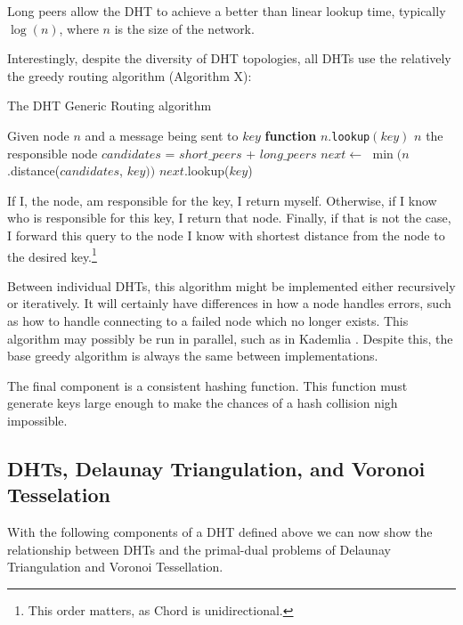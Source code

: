 \documentclass[11pt,conference]{IEEEtran}
\begin{document}
Long peers allow the DHT to achieve a better than linear lookup time, typically $ \log(n) $, where $n$ is the size of the network. 

Interestingly, despite the diversity of DHT topologies, all DHTs use the relatively the greedy routing algorithm (Algorithm X):

\begin{algorithm}
	\caption{The DHT Generic Routing algorithm}
	\label{alg:routing}
	\begin{algorithmic}[1]
		\STATE Given node $n$ and a message being sent to $key$
		\STATE \textbf{function} $n.$\texttt{lookup}$(key)$
			\RETURN $ n $
		\ENDIF
			\RETURN the responsible node
		\ENDIF
		\STATE $ candidates $ = $ short\_peers $ + $ long\_peers $
		\STATE $ next  \leftarrow $  $\min (n$.distance($candidates$, $ key ))$
		\RETURN $next.$lookup($key$)
	\end{algorithmic}
	
	\scriptsize
\end{algorithm}
If I, the node, am responsible for the key, I return myself.
Otherwise, if I know who is responsible for this key, I return that node.
Finally, if that is not the case, I forward this query to the node I know with shortest distance from the node to the desired key.\footnote{This order matters, as Chord is unidirectional.} 

Between individual DHTs, this algorithm might be implemented either recursively or iteratively.
It will certainly have differences in how a node handles errors, such as how to handle connecting to a failed node which no longer exists.
This algorithm may possibly be  run in parallel, such as in Kademlia \cite{kademlia}.
Despite this, the base greedy algorithm is always the same between implementations.

The final component is a consistent hashing function.
This function must generate keys large enough to make the chances of a hash collision nigh impossible.

\subsection{DHTs, Delaunay Triangulation, and Voronoi Tesselation}
With the following components of a DHT defined above we can now show the relationship between DHTs and the primal-dual problems of Delaunay Triangulation and Voronoi Tessellation.
\end{document}
